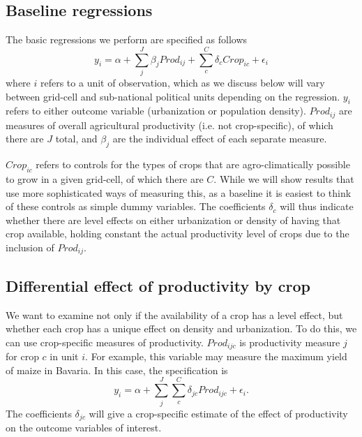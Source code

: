 \documentclass[10pt]{article}
\begin{document}
\subsection{Baseline regressions}
The basic regressions we perform are specified as follows
\begin{equation}
	y_{i} = \alpha + \sum_j^J \beta_j {Prod}_{ij} + \sum_{c}^C \delta_c {Crop}_{ic} + \epsilon_{i}
\end{equation}
where $i$ refers to a unit of observation, which as we discuss below will vary between grid-cell and sub-national political units depending on the regression. $y_{i}$ refers to either outcome variable (urbanization or population density). ${Prod}_{ij}$ are measures of overall agricultural productivity (i.e. not crop-specific), of which there are $J$ total, and $\beta_j$ are the individual effect of each separate measure.

${Crop}_{ic}$ refers to controls for the types of crops that are agro-climatically possible to grow in a given grid-cell, of which there are $C$. While we will show results that use more sophisticated ways of measuring this, as a baseline it is easiest to think of these controls as simple dummy variables. The coefficients $\delta_c$ will thus indicate whether there are level effects on either urbanization or density of having that crop available, holding constant the actual productivity level of crops due to the inclusion of $Prod_{ij}$.

\subsection{Differential effect of productivity by crop}
We want to examine not only if the availability of a crop has a level effect, but whether each crop has a unique effect on density and urbanization. To do this, we can use crop-specific measures of productivity. $Prod_{ijc}$ is productivity measure $j$ for crop $c$ in unit $i$. For example, this variable may measure the maximum yield of maize in Bavaria. In this case, the specification is
\begin{equation}
	y_{i} = \alpha + \sum_j^J \sum_{c}^C \delta_{jc} Prod_{ijc} + \epsilon_{i}.
\end{equation}
The coefficients $\delta_{jc}$ will give a crop-specific estimate of the effect of productivity on the outcome variables of interest.
\end{document}
